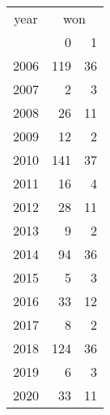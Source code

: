 \footnotesize\begin{tabular}[t]{lrr}
\toprule
\multicolumn{1}{c}{year} & \multicolumn{2}{c}{won} \\
\cmidrule(l{3pt}r{3pt}){1-1} \cmidrule(l{3pt}r{3pt}){2-3}
  & 0 & 1\\
\midrule
2006 & 119 & 36\\
2007 & 2 & 3\\
2008 & 26 & 11\\
2009 & 12 & 2\\
2010 & 141 & 37\\
2011 & 16 & 4\\
2012 & 28 & 11\\
2013 & 9 & 2\\
2014 & 94 & 36\\
2015 & 5 & 3\\
2016 & 33 & 12\\
2017 & 8 & 2\\
2018 & 124 & 36\\
2019 & 6 & 3\\
2020 & 33 & 11\\
\bottomrule
\end{tabular}
